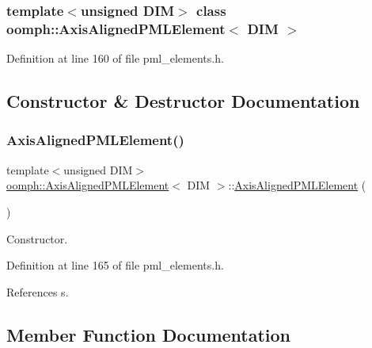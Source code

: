 \subsubsection*{template$<$unsigned D\+IM$>$\newline
class oomph\+::\+Axis\+Aligned\+P\+M\+L\+Element$<$ D\+I\+M $>$}



Definition at line 160 of file pml\+\_\+elements.\+h.



\subsection{Constructor \& Destructor Documentation}
\mbox{\label{classoomph_1_1AxisAlignedPMLElement_acb3d0ce377bf928f0fa83deedef775f0}} 
\subsubsection{\texorpdfstring{Axis\+Aligned\+P\+M\+L\+Element()}{AxisAlignedPMLElement()}}
{\footnotesize\ttfamily template$<$unsigned D\+IM$>$ \\
\hyperlink{classoomph_1_1AxisAlignedPMLElement}{oomph\+::\+Axis\+Aligned\+P\+M\+L\+Element}$<$ D\+IM $>$\+::\hyperlink{classoomph_1_1AxisAlignedPMLElement}{Axis\+Aligned\+P\+M\+L\+Element} (\begin{DoxyParamCaption}{ }\end{DoxyParamCaption})\hspace{0.3cm}{\ttfamily [inline]}}



Constructor. 



Definition at line 165 of file pml\+\_\+elements.\+h.



References s.



\subsection{Member Function Documentation}
\mbox{\label{classoomph_1_1AxisAlignedPMLElement_af5689e98392072da121eafa0b438e44c}} 

